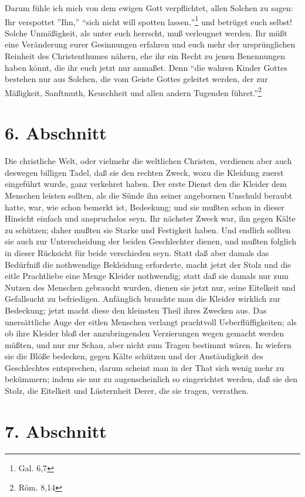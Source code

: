 Darum fühle ich mich von dem ewigen Gott verpflichtet, allen Solchen zu sagen:
Ihr verspottet ''Ihn,'' "`sich nicht will spotten lassen,"'\footnote{Gal. 6,7}
und betrüget euch selbst! Solche Unmäßigkeit, als unter euch herrscht, muß
verleugnet werden. Ihr müßt eine Veränderung eurer Gesinnungen erfahren und euch
mehr der ursprünglichen Reinheit des Christenthumes nähern, ehe ihr ein Recht zu
jenen Benennungen haben könnt, die ihr euch jetzt nur anmaßet. Denn "`die wahren
Kinder Gottes bestehen nur aus Solchen, die vom Geiste Gottes geleitet werden,
der zur Mäßigkeit, Sanftmuth, Keuschheit und allen andern Tugenden
führet."'\footnote{Röm. 8,14}

\section{6. Abschnitt}

Die christliche Welt, oder vielmehr die weltlichen Christen, verdienen aber auch
deswegen billigen Tadel, daß sie den rechten Zweck, wozu die Kleidung zuerst
eingeführt wurde, ganz verkehret haben. Der erste Dienst den die Kleider dem
Menschen leisten sollten, als die Sünde ihn seiner angebornen Unschuld beraubt
hatte, war, wie schon bemerkt ist, Bedeekung; und sie mußten schon in dieser
Hinsicht einfach und anspruchslos seyn. Ihr nächster Zweck war, ihn gegen Kälte
zu schützen; daher mußten sie Starke und Festigkeit haben. Und endlich sollten
sie auch zur Unterscheidung der beiden Geschlechter dienen, und mußten folglich
in dieser Rücksicht für beide verschieden seyn. Statt daß aber damals das
Bedürfniß die nothwendige Bekleidung erforderte, macht jetzt der Stolz und die
eitle Prachtliebe eine Menge Kleider nothwendig; statt daß sie damals nur zum
Nutzen des Menschen gebraucht wurden, dienen sie jetzt nur, seine Eitelkeit und
Gefallsucht zu befriedigen. Anfänglich brauchte man die Kleider wirklich zur
Bedeckung; jetzt macht diese den kleinsten Theil ihres Zwecken aus. Das
unersättliche Auge der eitlen Menschen verlangt prachtvoll Ueberflüffigkeiten;
als ob ihre Kleider bloß der anzubringenden Verzierungen wegen gemacht werden
müßten, und nur zur Schau, aber nicht zum Tragen bestimmt wären. In wiefern sie
die Blöße bedecken, gegen Kälte schützen und der Anstäudigkeit des Geschlechtes
entsprechen, darum scheint man in der That sich wenig mehr zu bekümmern; indem
sie nur zu augenscheinlich so eingerichtet werden, daß sie den Stolz, die
Eitelkeit und Lüsternheit Derer, die sie tragen, verrathen.

\section{7. Abschnitt}

